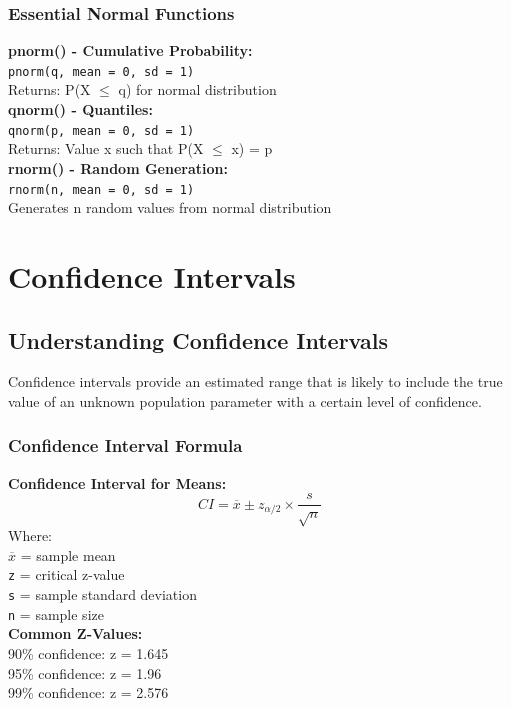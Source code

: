 \documentclass[11pt,a4paper]{article}
\begin{document}
\subsubsection{Essential Normal Functions}

\begin{formulabox}
\textbf{pnorm() - Cumulative Probability:}\\
\texttt{pnorm(q, mean = 0, sd = 1)}\\
Returns: P(X $\leq$ q) for normal distribution\\[0.3cm]
\textbf{qnorm() - Quantiles:}\\
\texttt{qnorm(p, mean = 0, sd = 1)}\\
Returns: Value x such that P(X $\leq$ x) = p\\[0.3cm]
\textbf{rnorm() - Random Generation:}\\
\texttt{rnorm(n, mean = 0, sd = 1)}\\
Generates n random values from normal distribution
\end{formulabox}

\section{Confidence Intervals}

\subsection{Understanding Confidence Intervals}

Confidence intervals provide an estimated range that is likely to include the true value of an unknown population parameter with a certain level of confidence.

\subsubsection{Confidence Interval Formula}

\begin{estimationbox}
\textbf{Confidence Interval for Means:}
$$CI = \overline{x} \pm z_{\alpha/2} \times \frac{s}{\sqrt{n}}$$
Where:\\
\texttt{$\overline{x}$} = sample mean\\
\texttt{z} = critical z-value\\
\texttt{s} = sample standard deviation\\
\texttt{n} = sample size\\[0.3cm]
\textbf{Common Z-Values:}\\
90\% confidence: z = 1.645\\
95\% confidence: z = 1.96\\
99\% confidence: z = 2.576
\end{estimationbox}
\end{document}
